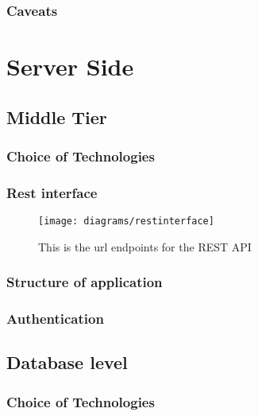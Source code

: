 \subsubsection*{Caveats}




\section{Server Side}

\subsection{Middle Tier}

\subsubsection*{Choice of Technologies}

\subsubsection*{Rest interface}



\begin{figure}[p]
    \centering
    \texttt{[image: diagrams/restinterface]}
    \caption{This is the url endpoints for the REST API}
    \label{fig:rest_pai_diagram_image}
\end{figure}

\subsubsection*{Structure of application}

\subsubsection*{Authentication}



\subsection{Database level}

\subsubsection*{Choice of Technologies}

